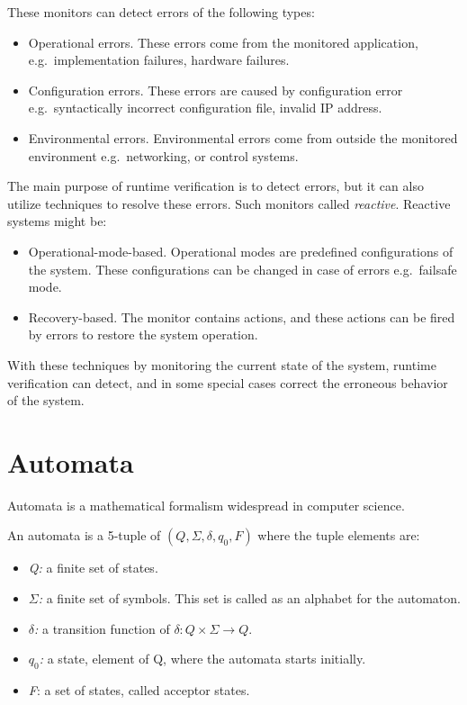 These monitors can detect errors of the following types:
\begin{itemize}
	\item Operational errors. These errors come from the monitored application, e.g.\ implementation failures, hardware failures.
	\item Configuration errors. These errors are caused by configuration error e.g.\ syntactically incorrect configuration file, invalid IP address.
	\item Environmental errors. Environmental errors come from outside the monitored environment e.g.\ networking, or control systems.
\end{itemize}

The main purpose of runtime verification is to detect errors, but it can also utilize techniques to resolve these errors. Such monitors called \emph{reactive}. Reactive systems might be:
\begin{itemize}
	\item Operational-mode-based. Operational modes are predefined configurations of the system. These configurations can be changed in case of errors e.g.\ failsafe mode.
	\item Recovery-based. The monitor contains actions, and these actions can be fired by errors to restore the system operation.
\end{itemize}

With these techniques by monitoring the current state of the system, runtime verification can detect, and in some special cases correct the erroneous behavior of the system.

\section{Automata}
\label{sec:automata}

Automata is a mathematical formalism widespread in computer science.

An automata is a 5-tuple of $(Q, \Sigma, \delta, q_0, F)$ where the tuple elements are:
\begin{itemize}
	\item \emph{Q:} a finite set of states.
	\item \emph{$\Sigma$:} a finite set of symbols. This set is called as an alphabet for the automaton.
	\item \emph{$\delta$:} a transition function of $\delta: Q \times \Sigma \rightarrow Q$.
	\item \emph{$q_0$:} a state, element of Q, where the automata starts initially.
	\item \emph{F}: a set of states, called acceptor states.
\end{itemize}

